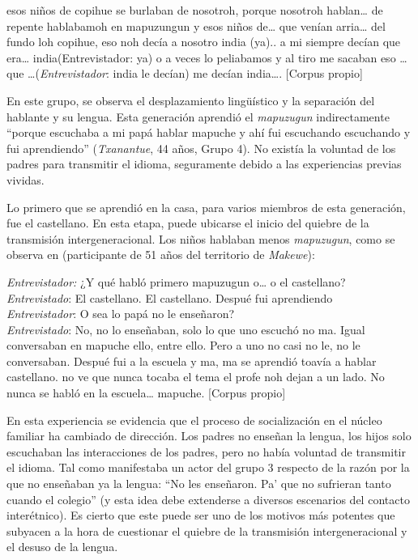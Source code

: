 \documentclass[output=paper]{../langscibook}
\begin{document}
\ea\label{ex:olate:9}
 esos niños de copihue se burlaban de nosotroh, porque nosotroh hablan… de repente hablabamoh en mapuzungun y esos niños de… que venían arria… del fundo loh copihue, eso noh decía a nosotro india (ya).. a mi siempre decían que era… india(Entrevistador: ya) o a veces lo peliabamos y al tiro me sacaban eso … que …(\emph{Entrevistador}: india le decían) me decían india…. \textup{[Corpus propio]}\\
\z

En este grupo, se observa el desplazamiento lingüístico y la separación del hablante y su lengua. Esta generación aprendió el \textit{mapuzugun} indirectamente “porque escuchaba a mi papá hablar mapuche y ahí fui escuchando escuchando y fui aprendiendo” (\textit{Txanantue}, 44 años, Grupo 4). No existía la voluntad de los padres para transmitir el idioma, seguramente debido a las experiencias previas vividas.

Lo primero que se aprendió en la casa, para varios miembros de esta generación, fue el castellano. En esta etapa, puede ubicarse el inicio del quiebre de la transmisión intergeneracional. Los niños hablaban menos \textit{mapuzugun}, como se observa en  (participante de 51 años del territorio de \textit{Makewe}):

\ea\label{ex:olate:10}
 \emph{Entrevistador:} ¿Y qué habló primero mapuzugun o… o el castellano?\\

 \emph{Entrevistado}: El castellano. El castellano. Despué fui aprendiendo \\
 \emph{Entrevistador}: O sea lo papá no le enseñaron? \\
 \emph{Entrevistado}: No, no lo enseñaban, solo lo que uno escuchó no ma. Igual conversaban en mapuche ello, entre ello. Pero a uno no casi no le, no le conversaban. Despué fui a la escuela y ma, ma se aprendió toavía a hablar castellano. no ve que nunca tocaba el tema el profe noh dejan a un lado. No nunca se habló en la escuela… mapuche. \textup{[Corpus propio]}\\
\z

En esta experiencia se evidencia que el proceso de socialización en el núcleo familiar ha cambiado de dirección. Los padres no enseñan la lengua, los hijos solo escuchaban las interacciones de los padres, pero no había voluntad de transmitir el idioma. Tal como manifestaba un actor del grupo 3 respecto de la razón por la que no enseñaban ya la lengua: “No les enseñaron. Pa’ que no sufrieran tanto cuando el colegio” (y esta idea debe extenderse a diversos escenarios del contacto interétnico). Es cierto que este puede ser uno de los motivos más potentes que subyacen a la hora de cuestionar el quiebre de la transmisión intergeneracional y el desuso de la lengua.
\end{document}
